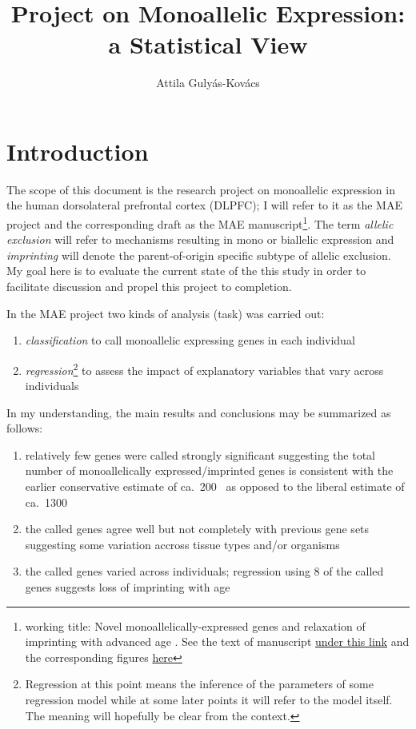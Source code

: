\documentclass[letterpaper]{article}
\title{Project on Monoallelic Expression: a Statistical View}
\author{Attila Gulyás-Kovács}
\begin{document}
\maketitle

\section{Introduction}

The scope of this document is the research project on monoallelic expression
in the human dorsolateral prefrontal cortex (DLPFC); I will refer to it as the
MAE project and the corresponding draft as the MAE manuscript\footnote{working
title: Novel monoallelically-expressed genes and relaxation of imprinting with
advanced age .  See the text of manuscript
\href{https://docs.google.com/document/d/1cWd4UH98SJR5lihDihC0ZO-C_A1-8MQ5COcixxCLzHE/edit?usp=sharing}{under
this link} and the corresponding figures
\href{https://docs.google.com/presentation/d/1YvpA1AJ-zzir1Iw0F25tO9x8gkSAzqaO4fjB7K3zBhE/edit?usp=sharing}{here}}.
The term \emph{allelic exclusion} will refer to mechanisms resulting in mono
or biallelic expression and \emph{imprinting} will denote the parent-of-origin
specific subtype of allelic exclusion.  My goal here is to evaluate the
current state of the this study in order to facilitate discussion and propel
this project to completion.

In the MAE project two kinds of analysis (task) was carried out:
\begin{enumerate}
\item \emph{classification} to call monoallelic expressing genes in each individual
\item \emph{regression}\footnote{Regression at this point means the inference
of the parameters of some regression model while at some later points it will
refer to the model itself.  The meaning will hopefully be clear from the
context.} to assess the impact of explanatory variables that vary across
individuals
\end{enumerate}

In my understanding, the main results and conclusions may be summarized as
follows:
\begin{enumerate}
\item relatively few genes were called strongly significant suggesting the
total number of monoallelically expressed/imprinted genes is consistent with
the earlier conservative estimate of ca.~200~\cite{DeVeale2012} as opposed to
the liberal estimate of ca.~1300~\cite{Gregg2010}
\item the called genes agree well but not completely with previous gene sets
suggesting some variation accross tissue types and/or organisms
\item the called genes varied across individuals; regression using 8 of the called
genes suggests loss of imprinting with age
\end{enumerate}
\end{document}

